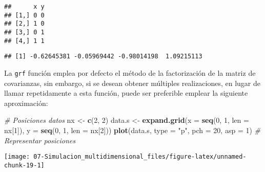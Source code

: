 \documentclass[
]{book}
\newenvironment{Shaded}{\begin{snugshade}}{\end{snugshade}}
\newcommand{\CommentTok}[1]{\textcolor[rgb]{0.56,0.35,0.01}{\textit{#1}}}
\newcommand{\DataTypeTok}[1]{\textcolor[rgb]{0.13,0.29,0.53}{#1}}
\newcommand{\DecValTok}[1]{\textcolor[rgb]{0.00,0.00,0.81}{#1}}
\newcommand{\KeywordTok}[1]{\textcolor[rgb]{0.13,0.29,0.53}{\textbf{#1}}}
\newcommand{\NormalTok}[1]{#1}
\newcommand{\OperatorTok}[1]{\textcolor[rgb]{0.81,0.36,0.00}{\textbf{#1}}}
\newcommand{\StringTok}[1]{\textcolor[rgb]{0.31,0.60,0.02}{#1}}
\theoremstyle{break}
\theoremstyle{definition}
\theoremstyle{definition}
\theoremstyle{definition}
\theoremstyle{remark}
\begin{document}
\begin{Shaded}
\end{Shaded}

\begin{verbatim}
##      x y
## [1,] 0 0
## [2,] 1 0
## [3,] 0 1
## [4,] 1 1
\end{verbatim}

\begin{Shaded}
\end{Shaded}

\begin{verbatim}
## [1] -0.62645381 -0.05969442 -0.98014198  1.09215113
\end{verbatim}

La \texttt{grf} función emplea por defecto el método de la factorización de la matriz de covarianzas,
sin embargo, si se desean obtener múltiples realizaciones, en lugar de llamar repetidamente a esta función,
puede ser preferible emplear la siguiente aproximación:

\begin{Shaded}
\begin{Highlighting}[]
\CommentTok{# Posiciones datos}
\NormalTok{nx <-}\StringTok{ }\KeywordTok{c}\NormalTok{(}\DecValTok{2}\NormalTok{, }\DecValTok{2}\NormalTok{)}
\NormalTok{data.s <-}\StringTok{ }\KeywordTok{expand.grid}\NormalTok{(}\DataTypeTok{x =} \KeywordTok{seq}\NormalTok{(}\DecValTok{0}\NormalTok{, }\DecValTok{1}\NormalTok{, }\DataTypeTok{len =}\NormalTok{ nx[}\DecValTok{1}\NormalTok{]), }\DataTypeTok{y =} \KeywordTok{seq}\NormalTok{(}\DecValTok{0}\NormalTok{, }\DecValTok{1}\NormalTok{, }\DataTypeTok{len =}\NormalTok{ nx[}\DecValTok{2}\NormalTok{]))}
\KeywordTok{plot}\NormalTok{(data.s, }\DataTypeTok{type =} \StringTok{"p"}\NormalTok{, }\DataTypeTok{pch =} \DecValTok{20}\NormalTok{, }\DataTypeTok{asp =} \DecValTok{1}\NormalTok{) }\CommentTok{# Representar posiciones}
\end{Highlighting}
\end{Shaded}

\begin{center}\texttt{[image: 07-Simulacion\_multidimensional\_files/figure-latex/unnamed-chunk-19-1]} \end{center}
\end{document}
